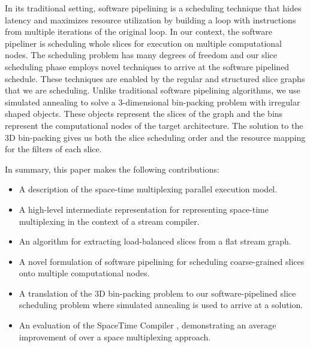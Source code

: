 In its traditional setting, software pipelining \cite{lam-softpipe,
rau-softpipe} is a scheduling technique that hides latency and
maximizes resource utilization by building a loop with instructions
from multiple iterations of the original loop.  In our context, the
software pipeliner is scheduling whole slices for execution on
multiple computational nodes. The scheduling problem has many degrees
of freedom and our slice scheduling phase employs novel techniques to
arrive at the software pipelined schedule.  These techniques are
enabled by the regular and structured slice graphs that we are
scheduling. Unlike traditional software pipelining algorithms, we use
simulated annealing to solve a 3-dimensional bin-packing problem with
irregular shaped objects.  These objects represent the slices of the
graph and the bins represent the computational nodes of the target
architecture.  The solution to the 3D bin-packing gives us both the
slice scheduling order and the resource mapping for the filters of
each slice.

In summary, this paper makes the following contributions:

\begin{itemize}
\item A description of the space-time multiplexing parallel execution
model.
\item A high-level intermediate representation for representing
space-time multiplexing in the context of a stream compiler.  
\item An algorithm for extracting load-balanced slices from a flat
stream graph.
\item A novel formulation of software pipelining for scheduling
coarse-grained slices onto multiple computational nodes.
\item A translation of the 3D bin-packing problem to our
software-pipelined slice scheduling problem where simulated annealing
is used to arrive at a solution.
\item An evaluation of the SpaceTime Compiler
, demonstrating an average improvement of  over a space
multiplexing approach.
\end{itemize}


